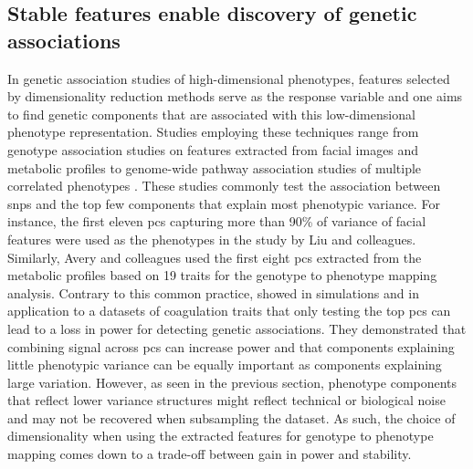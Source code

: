 \subsection{Stable features enable discovery of genetic associations}
\label{subsection:association-DimRed}
In genetic association studies of high-dimensional phenotypes, features selected by dimensionality reduction methods serve as the response variable and one aims to find genetic components that are associated with this low-dimensional phenotype representation. Studies employing these techniques range from genotype association studies on features extracted from facial images \citep{Liu2012} and metabolic profiles \citep{Avery2011} to genome-wide pathway association studies of multiple correlated phenotypes \citep{Zhang2012}. These studies commonly test the association between \glspl{snp} and the top few components that explain most phenotypic variance. For instance,  the first eleven \glspl{pc} capturing more than \num{90}\% of variance of facial features were used as the phenotypes in the study by Liu and colleagues. Similarly, Avery and colleagues used the first eight \glspl{pc} extracted from the metabolic profiles based on \num{19} traits for the genotype to phenotype mapping analysis. Contrary to this common practice, \citet{Aschard2014} showed in simulations and in application to a datasets of coagulation traits that only testing the top \glspl{pc} can lead to a loss in power for detecting genetic associations. They demonstrated that combining signal across \glspl{pc} can increase power and that components explaining little phenotypic variance can be equally important as components explaining large variation. However, as seen in the previous section, phenotype components that reflect lower variance structures might reflect technical or biological noise and may not be recovered when subsampling the dataset. As such, the choice of dimensionality when using the extracted features for genotype to phenotype mapping comes down to a trade-off between gain in power and stability.


